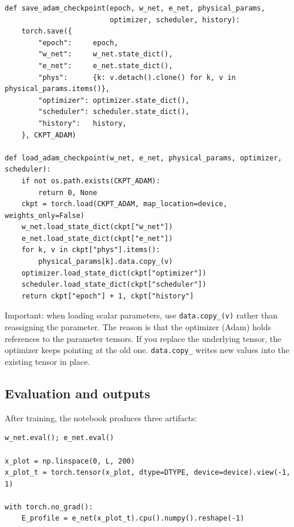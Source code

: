 \documentclass[11pt,a4paper]{article}
\begin{document}
\begin{lstlisting}[caption={Checkpoint save/load functions}]
def save_adam_checkpoint(epoch, w_net, e_net, physical_params,
                         optimizer, scheduler, history):
    torch.save({
        "epoch":     epoch,
        "w_net":     w_net.state_dict(),
        "e_net":     e_net.state_dict(),
        "phys":      {k: v.detach().clone() for k, v in physical_params.items()},
        "optimizer": optimizer.state_dict(),
        "scheduler": scheduler.state_dict(),
        "history":   history,
    }, CKPT_ADAM)

def load_adam_checkpoint(w_net, e_net, physical_params, optimizer, scheduler):
    if not os.path.exists(CKPT_ADAM):
        return 0, None
    ckpt = torch.load(CKPT_ADAM, map_location=device, weights_only=False)
    w_net.load_state_dict(ckpt["w_net"])
    e_net.load_state_dict(ckpt["e_net"])
    for k, v in ckpt["phys"].items():
        physical_params[k].data.copy_(v)
    optimizer.load_state_dict(ckpt["optimizer"])
    scheduler.load_state_dict(ckpt["scheduler"])
    return ckpt["epoch"] + 1, ckpt["history"]
\end{lstlisting}

Important: when loading scalar parameters, use \texttt{data.copy\_(v)} rather than reassigning the parameter. The reason is that the optimizer (Adam) holds references to the parameter tensors. If you replace the underlying tensor, the optimizer keeps pointing at the old one. \texttt{data.copy\_} writes new values into the existing tensor in place.

\subsection{Evaluation and outputs}

After training, the notebook produces three artifacts:

\begin{lstlisting}[caption={Evaluating $E(x)$ across the beam}]
w_net.eval(); e_net.eval()

x_plot = np.linspace(0, L, 200)
x_plot_t = torch.tensor(x_plot, dtype=DTYPE, device=device).view(-1, 1)

with torch.no_grad():
    E_profile = e_net(x_plot_t).cpu().numpy().reshape(-1)
\end{lstlisting}
\end{document}
